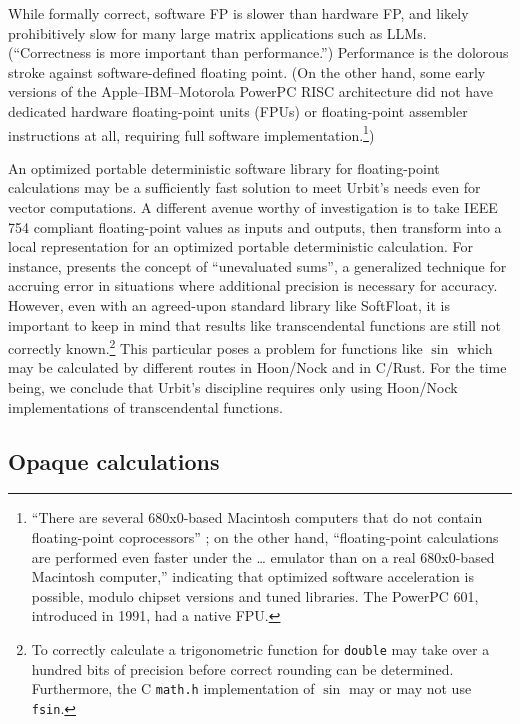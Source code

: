 \documentclass[twoside]{article}
\begin{document}
While formally correct, software FP is slower than hardware FP, and likely prohibitively slow for many large matrix applications such as LLMs.  (“Correctness is more important than performance.”)  Performance is the dolorous stroke against software-defined floating point.  (On the other hand, some early versions of the Apple–IBM–Motorola PowerPC RISC architecture did not have dedicated hardware floating-point units (FPUs) or floating-point assembler instructions at all, requiring full software implementation.\footnote{“There are several 680x0-based Macintosh computers that do not contain floating-point coprocessors” \citep{Apple1994}; on the other hand, “floating-point calculations are performed even faster under the … emulator than on a real 680x0-based Macintosh computer,” indicating that optimized software acceleration is possible, modulo chipset versions and tuned libraries.  The PowerPC 601, introduced in 1991, had a native FPU.})

An optimized portable deterministic software library for floating-point calculations may be a sufficiently fast solution to meet Urbit's needs even for vector computations.  A different avenue worthy of investigation is to take IEEE 754 compliant floating-point values as inputs and outputs, then transform into a local representation for an optimized portable deterministic calculation.  For instance, \citet{Thall2007} presents the concept of “unevaluated sums”, a generalized technique for accruing error in situations where additional precision is necessary for accuracy.  However, even with an agreed-upon standard library like SoftFloat, it is important to keep in mind that results like transcendental functions are still not correctly known.\footnote{To correctly calculate a trigonometric function for \texttt{double} may take over a hundred bits of precision before correct rounding can be determined.  Furthermore, the C \texttt{math.h} implementation of $\sin$ may or may not use \texttt{fsin}.}  This particular poses a problem for functions like $\sin$ which may be calculated by different routes in Hoon/Nock and in C/Rust.  For the time being, we conclude that Urbit's discipline requires only using Hoon/Nock implementations of transcendental functions.

\subsection{Opaque calculations}
\end{document}

